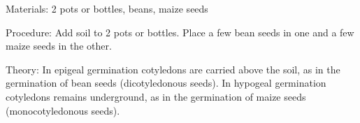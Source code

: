 \begin{multicols}{2}
\begin{description*}
\item[Materials:]{2 pots or bottles, beans, maize seeds}
\item[Procedure:]{Add soil to 2 pots or bottles. Place a few bean seeds in one and a few maize seeds in the other.}
\item[Theory:]{In epigeal germination cotyledons are carried above the soil, as in the germination of bean seeds (dicotyledonous seeds). In hypogeal germination cotyledons remains underground, as in the germination of maize seeds (monocotyledonous
seeds).}
\end{description*}



\end{multicols}

\pagebreak